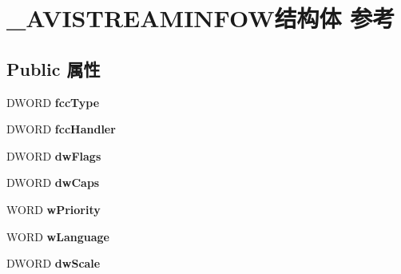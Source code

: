 \hypertarget{struct___a_v_i_s_t_r_e_a_m_i_n_f_o_w}{}\section{\+\_\+\+A\+V\+I\+S\+T\+R\+E\+A\+M\+I\+N\+F\+O\+W结构体 参考}
\label{struct___a_v_i_s_t_r_e_a_m_i_n_f_o_w}
\subsection*{Public 属性}
\begin{DoxyCompactItemize}
\item 
\mbox{\label{struct___a_v_i_s_t_r_e_a_m_i_n_f_o_w_a33de86bcd4b9036fefa4b4f9a128aac8}} 
D\+W\+O\+RD {\bfseries fcc\+Type}
\item 
\mbox{\label{struct___a_v_i_s_t_r_e_a_m_i_n_f_o_w_a8da9a1e4b54c93ed2b70c5723f112949}} 
D\+W\+O\+RD {\bfseries fcc\+Handler}
\item 
\mbox{\label{struct___a_v_i_s_t_r_e_a_m_i_n_f_o_w_a3f6b8f929eb3e8aef160dac9580cbd78}} 
D\+W\+O\+RD {\bfseries dw\+Flags}
\item 
\mbox{\label{struct___a_v_i_s_t_r_e_a_m_i_n_f_o_w_ac366025867a5905c18fa5bd000a93637}} 
D\+W\+O\+RD {\bfseries dw\+Caps}
\item 
\mbox{\label{struct___a_v_i_s_t_r_e_a_m_i_n_f_o_w_ad3c33434761f91328523f06e9c89e471}} 
W\+O\+RD {\bfseries w\+Priority}
\item 
\mbox{\label{struct___a_v_i_s_t_r_e_a_m_i_n_f_o_w_a48353beb0b953091e67ee304352213a1}} 
W\+O\+RD {\bfseries w\+Language}
\item 
\mbox{\label{struct___a_v_i_s_t_r_e_a_m_i_n_f_o_w_a65093ee0b6070a01c64be5d3acfef22c}} 
D\+W\+O\+RD {\bfseries dw\+Scale}
\item 
\mbox{\label{struct___a_v_i_s_t_r_e_a_m_i_n_f_o_w_abd5393d9ce01503e9b6a22c57c4cdb28}} 

\end{DoxyCompactItemize}
